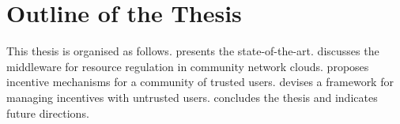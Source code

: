 
\section{Outline of the Thesis}
\label{sec__Thesis_Organisation}

This thesis is organised as follows. 
%
 presents the state-of-the-art.
%
 discusses the middleware for resource regulation in community network clouds.
%
%
 proposes incentive mechanisms for a community of trusted users.
%
 devises a framework for managing incentives with untrusted users.
%
 concludes the thesis and indicates future directions.
